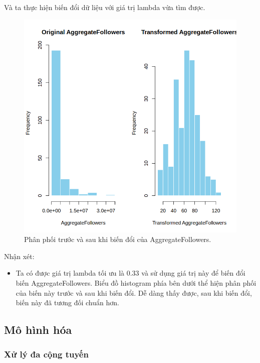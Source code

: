 Và ta thực hiện biến đổi dữ liệu với giá trị lambda vừa tìm được.
\begin{figure}[H]
    \centering
    \includegraphics[width=0.75\columnwidth]{csm_figures/af_transformed_distribution.png}
    \caption{Phân phối trước và sau khi biến đổi của AggregateFollowers.}
    \label{fig:af_transformed_distribution}
\end{figure}
Nhận xét:
\begin{itemize}
    \item Ta có được giá trị lambda tối ưu là 0.33 và sử dụng giá trị này để biến đổi biến AggregateFollowers. Biểu đồ histogram phía bên dưới thể hiện phân phối của biến này trước và sau khi biến đổi. Dễ dàng thấy được, sau khi biến đổi, biến này đã tương đối chuẩn hơn.
\end{itemize}

\subsection{Mô hình hóa}

\subsubsection{Xử lý đa cộng tuyến}

